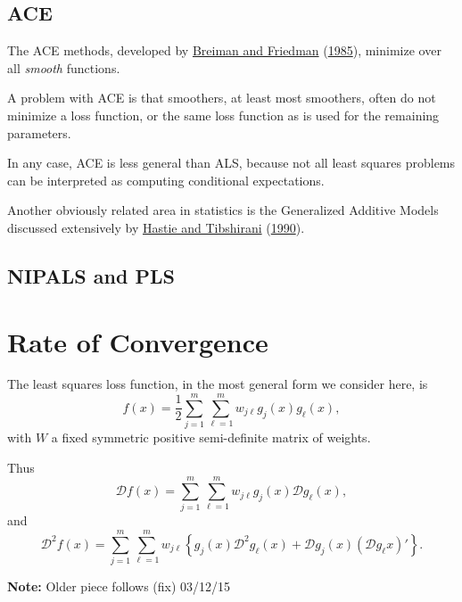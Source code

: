 \documentclass[
  12pt,
]{book}
\begin{document}
\hypertarget{alternatingleastsquares:closerelatives:ace}{%
\subsection{ACE}\label{alternatingleastsquares:closerelatives:ace}}

The ACE methods, developed by \protect\hyperlink{ref-breiman_friedman_85}{Breiman and Friedman} (\protect\hyperlink{ref-breiman_friedman_85}{1985}),
minimize over all \emph{smooth} functions.

A problem with
ACE is that smoothers, at least most smoothers, often do not
minimize a loss function, or the same loss function as is used for the
remaining parameters.

In any case, ACE is less general than ALS, because not all
least squares problems can be interpreted as computing
conditional expectations.

Another obviously
related area in statistics is the Generalized Additive Models discussed
extensively by \protect\hyperlink{ref-hastie_tibshirani_90}{Hastie and Tibshirani} (\protect\hyperlink{ref-hastie_tibshirani_90}{1990}).

\hypertarget{alternatingleastsquares:closerelatives:nipalsandpls}{%
\subsection{NIPALS and PLS}\label{alternatingleastsquares:closerelatives:nipalsandpls}}

\hypertarget{alternatingleastsquares:rateofconvergence}{%
\section{Rate of Convergence}\label{alternatingleastsquares:rateofconvergence}}

The least squares loss function, in the most general form we consider here, is
\[
f(x)=\frac12\sum_{j=1}^m\sum_{\ell=1}^m w_{j\ell}g_j(x)g_\ell(x),
\]
with \(W\) a fixed symmetric positive semi-definite matrix of weights.

Thus
\[
\mathcal{D}f(x)=\sum_{j=1}^m\sum_{\ell=1}^m w_{j\ell}g_j(x)\mathcal{D}g_\ell(x),
\]
and
\[
\mathcal{D}^2f(x)=\sum_{j=1}^m\sum_{\ell=1}^m w_{j\ell}
\left\{g_j(x)\mathcal{D}^2g_\ell(x)+\mathcal{D}g_j(x)(\mathcal{D}g_\ell{x})'\right\}.
\]

\textbf{Note:} Older piece follows (fix) 03/12/15
\end{document}
